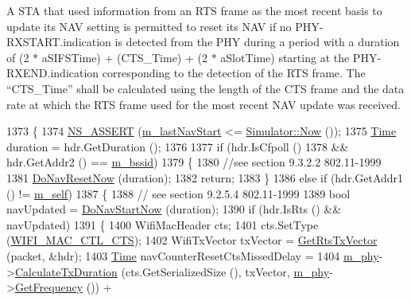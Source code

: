 A S\+TA that used information from an R\+TS frame as the most recent basis to update its N\+AV setting is permitted to reset its N\+AV if no P\+H\+Y-\/\+R\+X\+S\+T\+A\+R\+T.\+indication is detected from the P\+HY during a period with a duration of (2 $\ast$ a\+S\+I\+F\+S\+Time) + (C\+T\+S\+\_\+\+Time) + (2 $\ast$ a\+Slot\+Time) starting at the P\+H\+Y-\/\+R\+X\+E\+N\+D.\+indication corresponding to the detection of the R\+TS frame. The “\+C\+T\+S\+\_\+\+Time” shall be calculated using the length of the C\+TS frame and the data rate at which the R\+TS frame used for the most recent N\+AV update was received.
\begin{DoxyCode}
1373 \{
1374   \hyperlink{assert_8h_a6dccdb0de9b252f60088ce281c49d052}{NS\_ASSERT} (\hyperlink{classns3_1_1MacLow_ad306264b6f7c07d8b222d461f2d09b29}{m\_lastNavStart} <= \hyperlink{classns3_1_1Simulator_ac3178fa975b419f7875e7105be122800}{Simulator::Now} ());
1375   \hyperlink{namespacens3_1_1TracedValueCallback_a7ffd3e7c142ffe7c8a1d2db9b8de38ec}{Time} duration = hdr.GetDuration ();
1376 
1377   \textcolor{keywordflow}{if} (hdr.IsCfpoll ()
1378       && hdr.GetAddr2 () == \hyperlink{classns3_1_1MacLow_a36761d1d6c972817b9e2361952180923}{m\_bssid})
1379     \{
1380       \textcolor{comment}{//see section 9.3.2.2 802.11-1999}
1381       \hyperlink{classns3_1_1MacLow_abcc34d5e7e18f1f9df32adb248efccea}{DoNavResetNow} (duration);
1382       \textcolor{keywordflow}{return};
1383     \}
1386   \textcolor{keywordflow}{else} \textcolor{keywordflow}{if} (hdr.GetAddr1 () != \hyperlink{classns3_1_1MacLow_a23004ca5405c82111f5b20eec03b3d9a}{m\_self})
1387     \{
1388       \textcolor{comment}{// see section 9.2.5.4 802.11-1999}
1389       \textcolor{keywordtype}{bool} navUpdated = \hyperlink{classns3_1_1MacLow_ab35a898f608bb1103394e56a77c01343}{DoNavStartNow} (duration);
1390       \textcolor{keywordflow}{if} (hdr.IsRts () && navUpdated)
1391         \{
1400           WifiMacHeader cts;
1401           cts.SetType (\hyperlink{namespacens3_a9318472db39b35b2092de5c721e6ab0aa529299bd6c8159e0dc3f56acb749eff4}{WIFI\_MAC\_CTL\_CTS});
1402           WifiTxVector txVector = \hyperlink{classns3_1_1MacLow_ac6133f8084d7d290687da468665e36a0}{GetRtsTxVector} (packet, &hdr);
1403           \hyperlink{namespacens3_1_1TracedValueCallback_a7ffd3e7c142ffe7c8a1d2db9b8de38ec}{Time} navCounterResetCtsMissedDelay =
1404             \hyperlink{classns3_1_1MacLow_aec8aefec9501f9d7c06b6cd0ee1353ee}{m\_phy}->\hyperlink{classns3_1_1WifiPhy_aee98c7241bb4f0bb8e6d90f5771dacc7}{CalculateTxDuration} (cts.GetSerializedSize (), txVector, 
      \hyperlink{classns3_1_1MacLow_aec8aefec9501f9d7c06b6cd0ee1353ee}{m\_phy}->\hyperlink{classns3_1_1WifiPhy_ad2508d94faf22d690d6b8b4367934fd1}{GetFrequency} ()) +

\end{DoxyCode}
